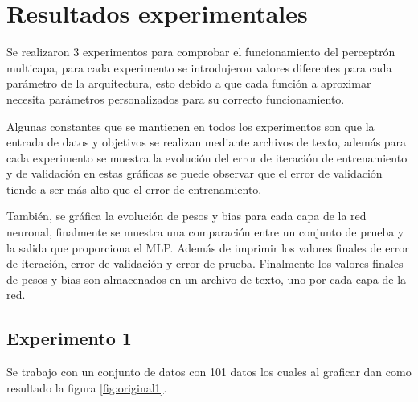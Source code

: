 \section{Resultados experimentales}
Se realizaron 3 experimentos para comprobar el funcionamiento del perceptrón multicapa, para cada experimento se introdujeron valores diferentes para cada parámetro de la arquitectura, esto debido a que cada función a aproximar necesita parámetros personalizados para su correcto funcionamiento.

Algunas constantes que se mantienen en todos los experimentos son que la entrada de datos y objetivos se realizan mediante archivos de texto, además para cada experimento se muestra la evolución del error de iteración de entrenamiento y de validación en estas gráficas se puede observar que el error de validación tiende a ser más alto que el error de entrenamiento.

También, se gráfica la evolución de pesos y bias para cada capa de la red neuronal, finalmente se muestra una comparación entre un conjunto de prueba y la salida que proporciona el MLP. Además de imprimir los valores finales de error de iteración, error de validación y error de prueba. Finalmente los valores finales de pesos y bias son almacenados en un archivo de texto, uno por cada capa de la red.
\subsection{Experimento 1}
Se trabajo con un conjunto de datos con 101 datos los cuales al graficar dan como resultado la figura \ref{fig:original1}.

